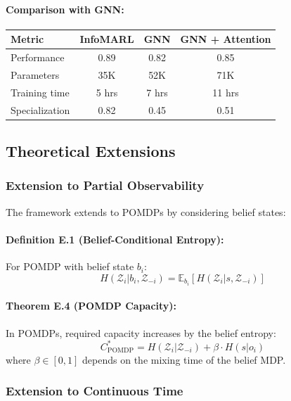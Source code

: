 \documentclass[10pt, letterpaper]{article}
\begin{document}
\paragraph{Comparison with GNN:}

\begin{center}
\begin{tabular}{lccc}
\toprule
\textbf{Metric} & \textbf{InfoMARL} & \textbf{GNN} & \textbf{GNN + Attention} \\
\midrule
Performance & 0.89 & 0.82 & 0.85 \\
Parameters & 35K & 52K & 71K \\
Training time & 5 hrs & 7 hrs & 11 hrs \\
Specialization & 0.82 & 0.45 & 0.51 \\
\bottomrule
\end{tabular}
\end{center}

\subsection{Theoretical Extensions}

\subsubsection{Extension to Partial Observability}

The framework extends to POMDPs by considering belief states:

\paragraph{Definition E.1 (Belief-Conditional Entropy):} For POMDP with belief state $b_i$:
\[H(\mathcal{Z}_i | b_i, \mathcal{Z}_{-i}) = \mathbb{E}_{b_i} [H(\mathcal{Z}_i | s, \mathcal{Z}_{-i})]\]

\paragraph{Theorem E.4 (POMDP Capacity):} In POMDPs, required capacity increases by the belief entropy:
\[C^*_{\text{POMDP}} = H(\mathcal{Z}_i | \mathcal{Z}_{-i}) + \beta \cdot H(s | o_i)\]
where $\beta \in [0,1]$ depends on the mixing time of the belief MDP.

\subsubsection{Extension to Continuous Time}
\end{document}

